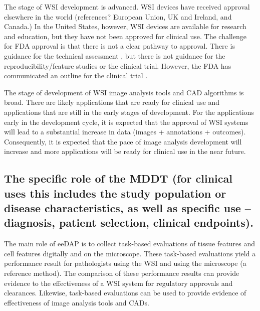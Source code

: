 \documentclass{article}%
\begin{document}
\label{the-stages-of-device-development-e.g.-early-feasibility-study-pivotal-study-etc.}%


The stage of WSI development is advanced. WSI devices have received approval
elsewhere in the world (references? European Union, UK and Ireland, and
Canada.) In the United States, however, WSI devices are available for research
and education, but they have not been approved for clinical use. The challenge
for FDA approval is that there is not a clear pathway to approval. There is
guidance for the technical assessment
\cite{FDA2016_Guidance-DigiPathTechnical}, but there is not guidance for the
reproducibility/feature studies or the clinical trial. However, the FDA has
communicated an outline for the clinical trial
\cite{Anderson2016_Path-Visions_presentation}.

The stage of development of WSI image analysis tools and CAD algorithms is
broad. There are likely applications that are ready for clinical use and
applications that are still in the early stages of development. For the
applications early in the development cycle, it is expected that the approval
of WSI systems will lead to a substantial increase in data (images +
annotations + outcomes). Consequently, it is expected that the pace of image
analysis development will increase and more applications will be ready for
clinical use in the near future.

\subsection{The specific role of the MDDT (for clinical uses this includes the
study population or disease characteristics, as well as specific use --
diagnosis, patient selection, clinical endpoints).}

\label{the-specific-role-of-the-mddt-for-clinical-uses-this-includes-the-study-population-or-disease-characteristics-as-well-as-specific-use-diagnosis-patient-selection-clinical-endpoints.}%


The main role of eeDAP is to collect task-based evaluations of tissue features
and cell features digitally and on the microscope. These task-based
evaluations yield a performance result for pathologists using the WSI and
using the microscope (a reference method). The comparison of these performance
results can provide evidence to the effectiveness of a WSI system for
regulatory approvals and clearances. Likewise, task-based evaluations can be
used to provide evidence of effectiveness of image analysis tools and CADs.
\end{document}
